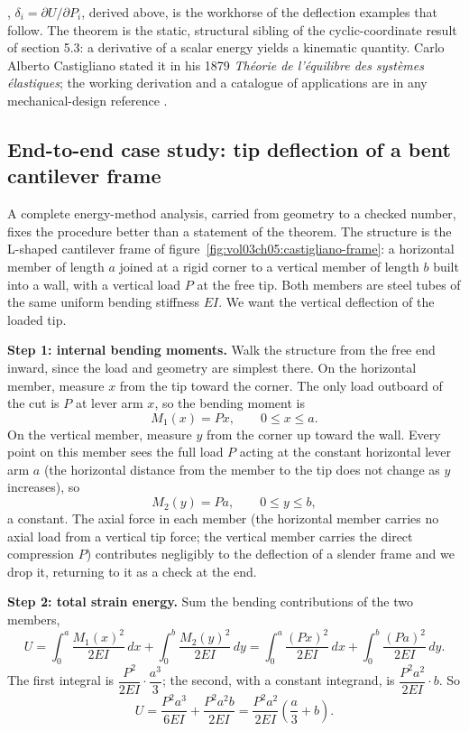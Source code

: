 , $\delta_i = \partial U/\partial
P_i$, derived above, is the workhorse of the deflection examples that
follow. The theorem is the static, structural sibling of the
cyclic-coordinate result of section 5.3: a derivative of a scalar energy
yields a kinematic quantity. Carlo Alberto Castigliano stated it in his
1879 \emph{Th\'eorie de l'\'equilibre des syst\`emes \'elastiques}; the
working derivation and a catalogue of applications are in any
mechanical-design reference \cite[ch.~4]{text:shigley-mechanical-design}.

\subsection{End-to-end case study: tip deflection of a bent cantilever
frame}

A complete energy-method analysis, carried from geometry to a checked
number, fixes the procedure better than a statement of the theorem. The
structure is the L-shaped cantilever frame of
figure~\ref{fig:vol03ch05:castigliano-frame}: a horizontal member of
length $a$ joined at a rigid corner to a vertical member of length $b$
built into a wall, with a vertical load $P$ at the free tip. Both members
are steel tubes of the same uniform bending stiffness $EI$. We want the
vertical deflection of the loaded tip.



\textbf{Step 1: internal bending moments.} Walk the structure from the
free end inward, since the load and geometry are simplest there. On the
horizontal member, measure $x$ from the tip toward the corner. The only
load outboard of the cut is $P$ at lever arm $x$, so the bending moment
is
\[
M_1(x) = P x,\qquad 0 \le x \le a.
\]
On the vertical member, measure $y$ from the corner up toward the wall.
Every point on this member sees the full load $P$ acting at the constant
horizontal lever arm $a$ (the horizontal distance from the member to the
tip does not change as $y$ increases), so
\[
M_2(y) = P a,\qquad 0 \le y \le b,
\]
a constant. The axial force in each member (the horizontal member carries
no axial load from a vertical tip force; the vertical member carries the
direct compression $P$) contributes negligibly to the deflection of a
slender frame and we drop it, returning to it as a check at the end.

\textbf{Step 2: total strain energy.} Sum the bending contributions of
the two members,
\[
U = \int_0^a \frac{M_1(x)^2}{2EI}\,dx
  + \int_0^b \frac{M_2(y)^2}{2EI}\,dy
  = \int_0^a \frac{(Px)^2}{2EI}\,dx
  + \int_0^b \frac{(Pa)^2}{2EI}\,dy.
\]
The first integral is $\dfrac{P^2}{2EI}\cdot\dfrac{a^3}{3}$; the second,
with a constant integrand, is $\dfrac{P^2 a^2}{2EI}\cdot b$. So
\[
U = \frac{P^2 a^3}{6EI} + \frac{P^2 a^2 b}{2EI}
  = \frac{P^2 a^2}{2EI}\left(\frac{a}{3} + b\right).
\]

